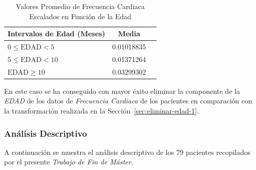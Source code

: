 \begin{table}[H]
    \centering
    \begin{tabular}{lcc}
        \toprule
        \textbf{Intervalos de Edad (Meses)} & \textbf{Media} \\
        \midrule
        $0 \leq \text{EDAD} < 5$ & 0.01018835 \\
        $5 \leq \text{EDAD} < 10$ & 0.01371264 \\
        $\text{EDAD} \geq 10$ & 0.03299302 \\
        \bottomrule
    \end{tabular}
    \caption{Valores Promedio de Frecuencia Cardiaca Escalados en Función de la Edad}
    \label{tabla:frecuencia-cardiaca-escalada-edad}
\end{table}

En este caso se ha conseguido con mayor éxito eliminar la componente de la \textit{EDAD} de los datos de \textit{Frecuencia Cardiaca} de los pacientes en comparación con la transformación realizada en la Sección~\ref{sec:eliminar-edad-1}.


\newpage
\subsubsection{Análisis Descriptivo}\label{sec:transformaciones-de-datos}

A continuación se muestra el análisis descriptivo de los $79$ pacientes recopilados por el presente \textit{Trabajo de Fin de Máster}. 

